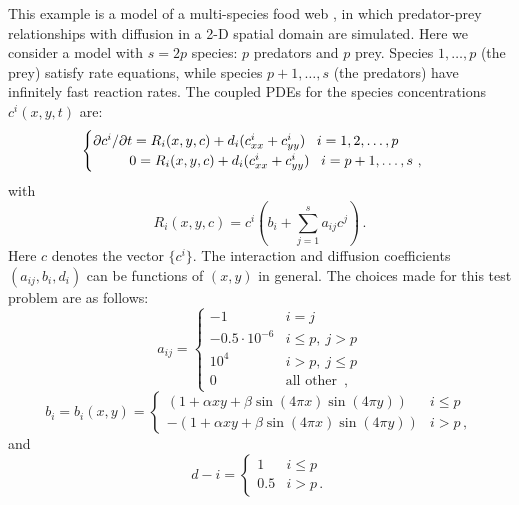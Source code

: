 This example is a model of a multi-species food web \cite{Bro:86}, in
which predator-prey relationships with diffusion in a 2-D spatial
domain are simulated.  Here we consider a model with $s = 2p$ species:
$p$ predators and $p$ prey.  Species $1,\ldots, p$ (the prey) satisfy
rate equations, while species $p+1,\ldots, s$ (the predators) have
infinitely fast reaction rates.  The coupled PDEs for the species
concentrations $c^i(x,y,t)$ are:
\begin{equation}\label{e:iwebsb_PDE}
  \begin{cases}
    \partial c^i / \partial t = R_i(x,y,c) + d_i 
    ( c^i_{xx} + c^i_{yy} ) \, ~~ i = 1,2,\ldots,p \\
    \hspace*{.36in}        0 = R_i(x,y,c) + d_i 
    ( c^i_{xx} + c^i_{yy} ) \, ~~ i = p+1,\ldots,s ~,
  \end{cases}
\end{equation}
with
\[
R_i(x,y,c) = c^i \left( b_i + \sum_{j=1}^s a_{ij} c^j \right) \, .
\]
Here $c$ denotes the vector $\{c^i\}$.
The interaction and diffusion coefficients $(a_{ij},b_i,d_i)$ can be
functions of $(x,y)$ in general. The choices made for this test
problem are as follows:
\begin{equation*}
  a_{ij} = 
  \begin{cases}
    -1                 & i=j \\
    -0.5 \cdot 10^{-6} & i \leq p , ~ j > p  \\
    10^4               & i > p , ~ j \leq p  \\
    0                  & \mbox{all other } \, ,
  \end{cases}
\end{equation*}
\begin{equation*}
  b_i = b_i(x,y) = 
  \begin{cases}
    (1 + \alpha xy + \beta \sin(4\pi x)\sin(4\pi y) )  & i \leq p  \\
    - (1 + \alpha xy + \beta \sin(4\pi x)\sin(4\pi y) )  & i > p \, ,
  \end{cases}
\end{equation*}
and
\begin{equation*}
  d-i = 
  \begin{cases}
    1 & i \leq p  \\
    0.5 & i > p  \, .
  \end{cases}
\end{equation*}

